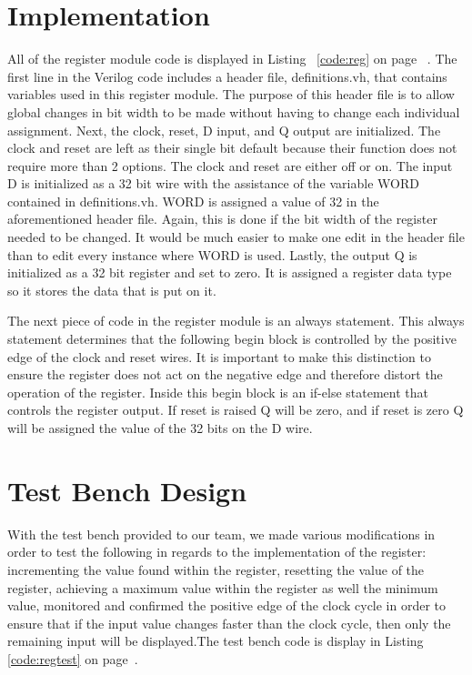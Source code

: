 \documentclass{article}
\newcommand{\Verilog}[3]{
  \lstset{language=Verilog}
  \lstset{backgroundcolor=\color{listinggray},rulecolor=\color{blue}}
  \lstset{linewidth=\textwidth}
  \lstset{commentstyle=\textit, stringstyle=\upshape,showspaces=false}
  \lstset{frame=tb}
  
}
\begin{document}
\section{Implementation}
All of the register module code is displayed in Listing~ \ref{code:reg} on page~ \pageref{code:reg}. The first line in the Verilog code includes a header file, definitions.vh, that contains variables used in this register module. The purpose of this header file is to allow global changes in bit width to be made without having to change each individual assignment. Next, the clock, reset, D input, and Q output are initialized. The clock and reset are left as their single bit default because their function does not require more than 2 options. The clock and reset are either off or on. The input D is initialized as a 32 bit wire with the assistance of the variable WORD contained in definitions.vh. WORD is assigned a value of 32 in the aforementioned header file. Again, this is done if the bit width of the register needed to be changed. It would be much easier to make one edit in the header file than to edit every instance where WORD is used. Lastly, the output Q is initialized as a 32 bit register and set to zero. It is assigned a register data type so it stores the data that is put on it. 

The next piece of code in the register module is an always statement. This always statement determines that the following begin block is controlled by the positive edge of the clock and reset wires. It is important to make this distinction to ensure the register does not act on the negative edge and therefore distort the operation of the register. Inside this begin block is an if-else statement that controls the register output. If reset is raised Q will be zero, and if reset is zero Q will be assigned the value of the 32 bits on the D wire.

\Verilog{Verilog code for implementing a register.}{code:reg}{H:/ELC-3338/MIPS_lab1/MIPS_lab1.srcs/register_test/imports/code/register.v}

\section{Test Bench Design}
With the test bench provided to our team, we made various modifications in order to test the following in regards to the implementation of the register: incrementing the value found within the register, resetting the value of the register, achieving a maximum value within the register as well the minimum value, monitored and confirmed the positive edge of the clock cycle in order to ensure that if the input value changes faster than the clock cycle, then only the remaining input will be displayed.The test bench code is display in Listing~ \ref{code:regtest}  on page~\pageref{code:regtest}.
\end{document}

